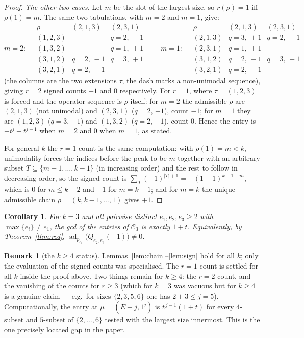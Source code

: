 \documentclass[11pt]{article}
\newtheorem{corollary}[theorem]{Corollary}
\theoremstyle{definition}
\newtheorem{remark}[theorem]{Remark}
\newcommand{\Ck}{\mathcal{C}}
\begin{document}
\begin{proof}
\emph{The other two cases.} Let $m$ be the slot of the largest size, so $r(\rho)=1$ iff
$\rho(1)=m$. The same two tabulations, with $m=2$ and $m=1$, give:
\[
m=2:\quad
\begin{array}{c|cc}
\rho & (2,1,3) & (2,3,1)\\\hline
(1,2,3) & \text{---} & q{=}2,\,-1\\
(1,3,2) & \text{---} & q{=}1,\,+1\\
(3,1,2) & q{=}2,\,-1 & q{=}3,\,+1\\
(3,2,1) & q{=}2,\,-1 & \text{---}
\end{array}
\qquad
m=1:\quad
\begin{array}{c|cc}
\rho & (2,1,3) & (2,3,1)\\\hline
(2,1,3) & q{=}3,\,+1 & q{=}2,\,-1\\
(2,3,1) & q{=}1,\,+1 & \text{---}\\
(3,1,2) & q{=}2,\,-1 & q{=}3,\,+1\\
(3,2,1) & q{=}2,\,-1 & \text{---}
\end{array}
\]
(the columns are the two extensions $\tau$, the dash marks a non-unimodal sequence), giving
$r=2$ signed counts $-1$ and $0$ respectively. For $r=1$, where $\tau=(1,2,3)$ is forced and the
operator sequence is $\rho$ itself: for $m=2$ the admissible $\rho$ are $(2,1,3)$ (not unimodal)
and $(2,3,1)$ ($q=2$, $-1$), count $-1$; for $m=1$ they are $(1,2,3)$ ($q=3$, $+1$) and
$(1,3,2)$ ($q=2$, $-1$), count $0$. Hence the entry is $-t^{j}-t^{j-1}$ when $m=2$ and $0$ when
$m=1$, as stated.

For general $k$ the $r=1$ count is the same computation: with $\rho(1)=m<k$, unimodality forces
the indices before the peak to be $m$ together with an arbitrary subset
$T\subseteq\{m+1,\dots,k-1\}$ (in increasing order) and the rest to follow in decreasing order,
so the signed count is $\sum_{T}(-1)^{|T|+1}=-(1-1)^{k-1-m}$, which is $0$ for $m\le k-2$ and
$-1$ for $m=k-1$; and for $m=k$ the unique admissible chain $\rho=(k,k-1,\dots,1)$ gives $+1$.
\end{proof}

\begin{corollary}
For $k=3$ and all pairwise distinct $e_1,e_2,e_3\ge2$ with $\max\{e_i\}\ne e_1$, the gcd of the
entries of $\Ck_3$ is exactly $1+t$. Equivalently, by Theorem~\ref{thm:red},
$\operatorname{ad}_{p_{e_1}}\bigl(Q_{e_2,e_3}(-1)\bigr)\ne0$.
\end{corollary}

\begin{remark}[the $k\ge4$ status]
Lemmas~\ref{lem:chain}--\ref{lem:sign} hold for all $k$; only the evaluation of the signed counts
was specialised. The $r=1$ count is settled for all $k$ inside the proof above. Two things remain
for $k\ge4$: the $r=2$ count, and the vanishing of the counts for $r\ge3$ (which for $k=3$ was
vacuous but for $k\ge4$ is a genuine claim --- e.g.\ for sizes $\{2,3,5,6\}$ one has
$2+3\le j=5$). Computationally, the entry at $\mu=(E-j,1^j)$ is $t^{\,j-1}(1+t)$ for every
$4$-subset and $5$-subset of $\{2,\dots,6\}$ tested with the largest size innermost. This is the
one precisely located gap in the paper.
\end{remark}
\end{document}
